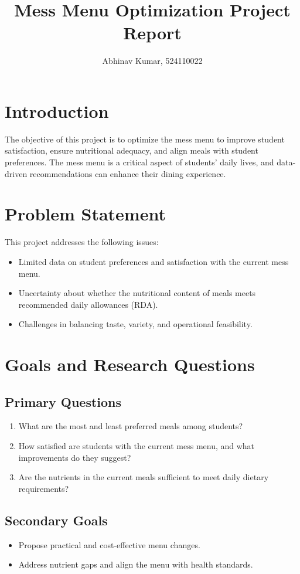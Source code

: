 \documentclass[12pt,a4paper]{article}
\title{\textbf{Mess Menu Optimization Project Report}}
\author{Abhinav Kumar, 524110022}
\date{}
\begin{document}
\maketitle
\newpage

\section{Introduction}
The objective of this project is to optimize the mess menu to improve student satisfaction, ensure nutritional adequacy, and align meals with student preferences. The mess menu is a critical aspect of students' daily lives, and data-driven recommendations can enhance their dining experience.

\section{Problem Statement}
This project addresses the following issues:
\begin{itemize}
    \item Limited data on student preferences and satisfaction with the current mess menu.
    \item Uncertainty about whether the nutritional content of meals meets recommended daily allowances (RDA).
    \item Challenges in balancing taste, variety, and operational feasibility.
\end{itemize}

\section{Goals and Research Questions}
\subsection{Primary Questions}
\begin{enumerate}
    \item What are the most and least preferred meals among students?
    \item How satisfied are students with the current mess menu, and what improvements do they suggest?
    \item Are the nutrients in the current meals sufficient to meet daily dietary requirements?
\end{enumerate}

\subsection{Secondary Goals}
\begin{itemize}
    \item Propose practical and cost-effective menu changes.
    \item Address nutrient gaps and align the menu with health standards.
\end{itemize}
\end{document}
